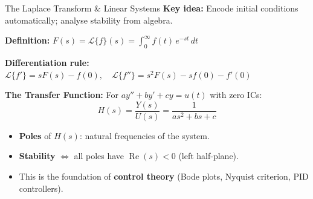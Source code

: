 \begin{frame}{The Laplace Transform \& Linear Systems}
\textbf{Key idea:} Encode initial conditions automatically; analyse stability from algebra.

\vspace{0.15cm}
\textbf{Definition:}
$\displaystyle F(s) = \mathcal{L}\{f\}(s) = \int_0^{\infty} f(t)\, e^{-st}\, dt$

\vspace{0.15cm}
\textbf{Differentiation rule:}
$\displaystyle \mathcal{L}\{f'\} = sF(s) - f(0), \quad \mathcal{L}\{f''\} = s^2F(s) - sf(0) - f'(0)$

\vspace{0.15cm}
\textbf{The Transfer Function:} For $a y'' + b y' + c y = u(t)$ with zero ICs:
\[
H(s) = \frac{Y(s)}{U(s)} = \frac{1}{as^2 + bs + c}
\]

\begin{itemize}
    \item \textbf{Poles} of $H(s)$: natural frequencies of the system.
    \item \textbf{Stability} $\Longleftrightarrow$ all poles have $\operatorname{Re}(s) < 0$ \quad (left half-plane).
    \item This is the foundation of \textbf{control theory} (Bode plots, Nyquist criterion, PID controllers).
\end{itemize}
\end{frame}
